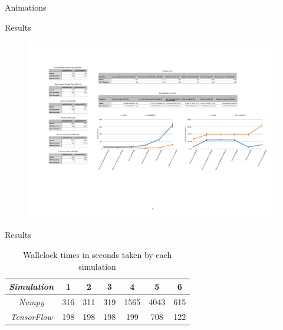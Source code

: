 \documentclass{beamer}
\begin{document}
\begin{frame}{Animations}

\end{frame}

\begin{frame}{Results}


\begin{figure}[H] 
	\centering
	\label{videoCuts}
	\includegraphics[width=4.5in]{Diagrams/TimeGraph.pdf}
\end{figure}

\end{frame}

\begin{frame}{Results}

\begin{table}[H]
\caption{Wallclock times in seconds taken by each simulation}
\begin{center}
\begin{tabular}{c||c|c|c|c|c|c}
\emph{Simulation} & 1 & 2 & 3 & 4 & 5 & 6\\
\hline
\hline
\emph{Numpy} & 316 & 311 & 319 & 1565 & 4043 & 615 \\
\hline
\emph{TensorFlow} & 198 & 198 & 198 & 199 & 708 & 122 \\
\hline
\end{tabular}
\end{center}
\end{table}

\end{frame}
\end{document}
